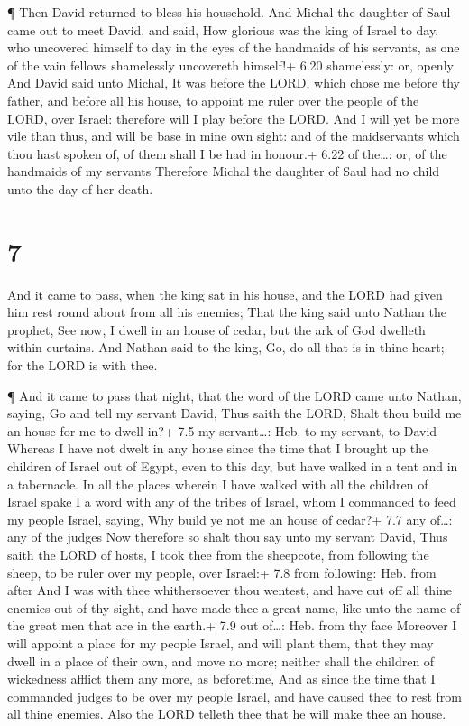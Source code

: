  ¶ Then David returned to bless his household. And Michal
the daughter of Saul came out to meet David, and said, How glorious was
the king of Israel to day, who uncovered himself to day in the eyes of
the handmaids of his servants, as one of the vain fellows shamelessly
uncovereth himself!+ 6.20 shamelessly: or, openly  And
David said unto Michal, It was before the LORD, which chose me before
thy father, and before all his house, to appoint me ruler over the
people of the LORD, over Israel: therefore will I play before the LORD.
 And I will yet be more vile than thus, and will be base in
mine own sight: and of the maidservants which thou hast spoken of, of
them shall I be had in honour.+ 6.22 of the\ldots: or, of the handmaids
of my servants  Therefore Michal the daughter of Saul had
no child unto the day of her death.

\hypertarget{section-6}{%
\section{7}\label{section-6}}

 And it came to pass, when the king sat in his house, and
the LORD had given him rest round about from all his enemies;
 That the king said unto Nathan the prophet, See now, I
dwell in an house of cedar, but the ark of God dwelleth within curtains.
 And Nathan said to the king, Go, do all that is in thine
heart; for the LORD is with thee.

 ¶ And it came to pass that night, that the word of the LORD
came unto Nathan, saying,  Go and tell my servant David,
Thus saith the LORD, Shalt thou build me an house for me to dwell in?+
7.5 my servant\ldots: Heb. to my servant, to David  Whereas
I have not dwelt in any house since the time that I brought up the
children of Israel out of Egypt, even to this day, but have walked in a
tent and in a tabernacle.  In all the places wherein I have
walked with all the children of Israel spake I a word with any of the
tribes of Israel, whom I commanded to feed my people Israel, saying, Why
build ye not me an house of cedar?+ 7.7 any of\ldots: any of the judges
 Now therefore so shalt thou say unto my servant David, Thus
saith the LORD of hosts, I took thee from the sheepcote, from following
the sheep, to be ruler over my people, over Israel:+ 7.8 from following:
Heb. from after  And I was with thee whithersoever thou
wentest, and have cut off all thine enemies out of thy sight, and have
made thee a great name, like unto the name of the great men that are in
the earth.+ 7.9 out of\ldots: Heb. from thy face  Moreover
I will appoint a place for my people Israel, and will plant them, that
they may dwell in a place of their own, and move no more; neither shall
the children of wickedness afflict them any more, as beforetime,
 And as since the time that I commanded judges to be over
my people Israel, and have caused thee to rest from all thine enemies.
Also the LORD telleth thee that he will make thee an house.

